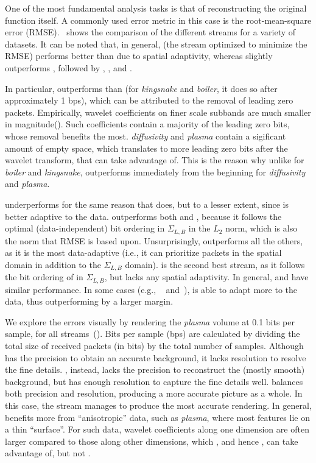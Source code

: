 One of the most fundamental analysis tasks is that of reconstructing the original function itself. A
commonly used error metric in this case is the root-mean-square error
(RMSE).~ shows the comparison of the different streams for a variety of
datasets. It can be noted that, in general, \srop (the stream optimized to minimize the RMSE)
performs better than \srsg due to spatial adaptivity, whereas \srsg slightly outperforms \swav,
followed by \sbit, \smag, and \slvl.

In particular, \sbit outperforms than \slvl (for \emph{kingsnake} and \emph{boiler}, it does so
after approximately 1 bps), which can be attributed to the removal of leading zero packets.
Empirically, wavelet coefficients on finer scale subbands are much smaller in
magnitude(). Such coefficients contain a majority of the leading zero bits, whose removal
benefits \sbit the most. \emph{diffusivity} and \emph{plasma} contain a sigificant amount of empty
space, which translates to more leading zero bits after the wavelet transform, that \sbit can take
advantage of. This is the reason why unlike for \emph{boiler} and \emph{kingsnake}, \sbit
outperforms \slvl immediately from the beginning for \emph{diffusivity} and \emph{plasma}.

\smag underperforms for the same reason that \slvl does, but to a lesser extent, since \smag is
better adaptive to the data. \swav outperforms both \slvl and \sbit, because it follows the optimal
(data-independent) bit ordering in $\Sigma_{L,B}$ in the $L_2$ norm, which is also the norm that
RMSE is based upon. Unsurprisingly, \sopt outperforms all the others, as it is the most
data-adaptive (i.e., it can prioritize packets in the spatial domain in addition to the
$\Sigma_{L,B}$ domain). \ssig is the second best stream, as it follows the bit ordering of \sopt in
$\Sigma_{L,B}$, but lacks any spatial adaptivity. In general, \swav and \ssig have similar
performance. In some cases (e.g., ~ and~), \ssig is
able to adapt more to the data, thus outperforming \swav by a larger margin.

We explore the errors visually by rendering the \emph{plasma} volume at 0.1 bits per sample, for all
streams~(). Bits per sample (bps) are calculated by dividing the total size
of received packets (in bits) by the total number of samples.  Although \slvl has the precision to obtain an accurate background, it
lacks resolution to resolve the fine details. \sbit, instead, lacks the precision to reconstruct the
(mostly smooth) background, but has enough resolution to capture the fine details well. \swav
balances both precision and resolution, producing a more accurate picture as a whole. In this case,
the \ssig stream manages to produce the most accurate rendering. In general, \ssig benefits more
from ``anisotropic'' data, such as \emph{plasma}, where most features lie on a thin ``surface''. For
such data, wavelet coefficients along one dimension are often larger compared to those along other
dimensions, which \sopt, and hence \ssig, can take advantage of, but not \swav.
